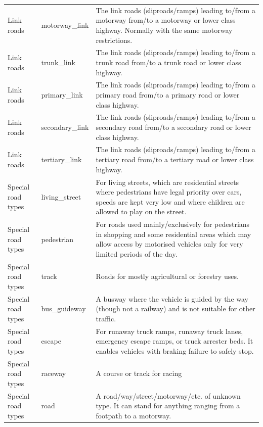 \documentclass[abstract=on,10pt,a4paper,bibliography=totocnumbered]{scrartcl}
\begin{document}
\begin{table}[h]
\begin{center}
{\begin{tabular}{llp{13cm}}
      \rowcolor[gray]{0.80}
      Link roads &
        motorway\_link &
          The link roads (sliproads/ramps) leading to/from a motorway from/to
          a motorway or lower class highway. Normally with the same motorway
          restrictions. \\
      \rowcolor[gray]{0.80}
      Link roads &
        trunk\_link &
          The link roads (sliproads/ramps) leading to/from a trunk road
          from/to a trunk road or lower class highway. \\
      \rowcolor[gray]{0.80}
      Link roads &
        primary\_link &
          The link roads (sliproads/ramps) leading to/from a primary road
          from/to a primary road or lower class highway. \\
      \rowcolor[gray]{0.80}
      Link roads &
        secondary\_link &
          The link roads (sliproads/ramps) leading to/from a secondary road
          from/to a secondary road or lower class highway. \\
      Link roads &
        tertiary\_link &
          The link roads (sliproads/ramps) leading to/from a tertiary road
          from/to a tertiary road or lower class highway. \\
      Special road types &
        living\_street &
          For living streets, which are residential streets where pedestrians
          have legal priority over cars, speeds are kept very low and where
          children are allowed to play on the street. \\
      Special road types &
        pedestrian &
          For roads used mainly/exclusively for pedestrians in shopping and
          some residential areas which may allow access by motorised vehicles
          only for very limited periods of the day. \\
      Special road types &
        track &
          Roads for mostly agricultural or forestry uses. \\
      Special road types &
        bus\_guideway &
          A busway where the vehicle is guided by the way (though not a railway)
          and is not suitable for other traffic. \\
      Special road types &
        escape &
          For runaway truck ramps, runaway truck lanes, emergency escape
          ramps, or truck arrester beds. It enables vehicles with braking
          failure to safely stop. \\
      Special road types &
        raceway &
          A course or track for racing \\
      Special road types &
        road &
          A road/way/street/motorway/etc. of unknown type. It can stand for
          anything ranging from a footpath to a motorway. \\
      \bottomrule
      \end{tabular}
    }
  \end{center}
\end{table}
\end{document}

